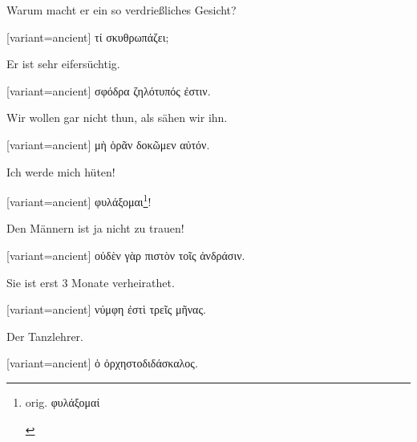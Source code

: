 Warum macht er ein so verdrießliches Gesicht? 

\switchcolumn

\begin{greek}[variant=ancient]%
τί σκυθρωπάζει;

\end{greek}%
\switchcolumn*

Er ist sehr eifersüchtig. 

\switchcolumn

\begin{greek}[variant=ancient]%
σφόδρα ζηλότυπός ἐστιν.

\end{greek}%
\switchcolumn*

Wir wollen gar nicht thun, als sähen wir ihn. 

\switchcolumn

\begin{greek}[variant=ancient]%
μὴ ὁρᾶν δοκῶμεν αὐτόν.

\end{greek}%
\switchcolumn*

Ich werde mich hüten! 

\switchcolumn

\begin{greek}[variant=ancient]%
φυλάξομαι\footnote{\begin{latin}%
orig. \textgreek[variant=ancient]{φυλάξομαί}\end{latin}%
}!

\end{greek}%
\switchcolumn*

Den Männern ist ja nicht zu trauen! 

\switchcolumn

\begin{greek}[variant=ancient]%
οὐδὲν γὰρ πιστὸν τοῖς ἀνδράσιν.

\end{greek}%
\switchcolumn*

Sie ist erst 3 Monate verheirathet. 

\switchcolumn

\begin{greek}[variant=ancient]%
νύμφη ἐστὶ τρεῖς μῆνας.

\end{greek}%
\switchcolumn*

Der Tanzlehrer. 

\switchcolumn

\begin{greek}[variant=ancient]%
ὁ ὀρχηστοδιδάσκαλος.

\end{greek}%
\switchcolumn*

